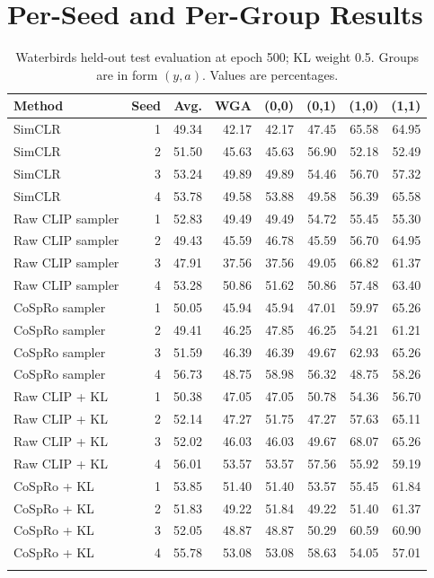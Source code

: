 \documentclass{article}
\begin{document}
\section{Per-Seed and Per-Group Results}
\label{app:seedresults}
\begin{table}[htbp]
\centering\small
\setlength{\tabcolsep}{4pt}
\caption{Waterbirds held-out test evaluation at epoch 500; KL weight 0.5. Groups are in form $(y,a)$. Values are percentages.}
\begin{tabular}{lrrrrrrr}
\toprule
Method & Seed & Avg. & WGA & (0,0) & (0,1) & (1,0) & (1,1) \\
\midrule
SimCLR & 1 & 49.34 & 42.17 & 42.17 & 47.45 & 65.58 & 64.95 \\
SimCLR & 2 & 51.50 & 45.63 & 45.63 & 56.90 & 52.18 & 52.49 \\
SimCLR & 3 & 53.24 & 49.89 & 49.89 & 54.46 & 56.70 & 57.32 \\
SimCLR & 4 & 53.78 & 49.58 & 53.88 & 49.58 & 56.39 & 65.58 \\
\addlinespace
Raw CLIP sampler & 1 & 52.83 & 49.49 & 49.49 & 54.72 & 55.45 & 55.30 \\
Raw CLIP sampler & 2 & 49.43 & 45.59 & 46.78 & 45.59 & 56.70 & 64.95 \\
Raw CLIP sampler & 3 & 47.91 & 37.56 & 37.56 & 49.05 & 66.82 & 61.37 \\
Raw CLIP sampler & 4 & 53.28 & 50.86 & 51.62 & 50.86 & 57.48 & 63.40 \\
\addlinespace
CoSpRo sampler & 1 & 50.05 & 45.94 & 45.94 & 47.01 & 59.97 & 65.26 \\
CoSpRo sampler & 2 & 49.41 & 46.25 & 47.85 & 46.25 & 54.21 & 61.21 \\
CoSpRo sampler & 3 & 51.59 & 46.39 & 46.39 & 49.67 & 62.93 & 65.26 \\
CoSpRo sampler & 4 & 56.73 & 48.75 & 58.98 & 56.32 & 48.75 & 58.26 \\
\addlinespace
Raw CLIP + KL & 1 & 50.38 & 47.05 & 47.05 & 50.78 & 54.36 & 56.70 \\
Raw CLIP + KL & 2 & 52.14 & 47.27 & 51.75 & 47.27 & 57.63 & 65.11 \\
Raw CLIP + KL & 3 & 52.02 & 46.03 & 46.03 & 49.67 & 68.07 & 65.26 \\
Raw CLIP + KL & 4 & 56.01 & 53.57 & 53.57 & 57.56 & 55.92 & 59.19 \\
\addlinespace
CoSpRo + KL & 1 & 53.85 & 51.40 & 51.40 & 53.57 & 55.45 & 61.84 \\
CoSpRo + KL & 2 & 51.83 & 49.22 & 51.84 & 49.22 & 51.40 & 61.37 \\
CoSpRo + KL & 3 & 52.05 & 48.87 & 48.87 & 50.29 & 60.59 & 60.90 \\
CoSpRo + KL & 4 & 55.78 & 53.08 & 53.08 & 58.63 & 54.05 & 57.01 \\
\addlinespace
\bottomrule
\end{tabular}
\end{table}
\end{document}
